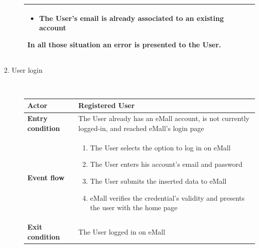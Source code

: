 \documentclass[11pt]{article}
\begin{document}
\begin{description}
\begin{table}[H]
\begin{tabularx}{\textwidth}{|>{\hsize=0.5\hsize}X|>{\hsize=1.5\hsize}X|}
\begin{minipage}[t]{\hsize}
\begin{itemize}[topsep=0pt, leftmargin=*]
                    \item The User's email is already associated to an existing account
                \end{itemize}
                \vspace{8pt}
                \end{minipage}
                In all those situation an error is presented to the User.
                \vspace{6pt}
            \\
            \hline
        \end{tabularx}
    \end{table}
    
    \item [2. User login] \hfill \\
    \begin{table}[H]
        \centering
        \setlength{\tabcolsep}{18pt}
        \renewcommand{\arraystretch}{1.4}
        \begin{tabularx}{\textwidth}{|>{\hsize=0.5\hsize}X|>{\hsize=1.5\hsize}X|}
            \hline
            \textbf{Actor} & Registered User \\
            \hline
            \textbf{Entry condition} & The User already has an eMall account, is not currently logged-in, and reached eMall's login page \\
            \hline
            \textbf{Event flow} & 
                \begin{minipage}[t]{\hsize}
                \begin{enumerate}[topsep=0pt, leftmargin=*]
                    \item The User selects the option to log in on eMall
                    \item The User enters his account's email and password
                    \item The User submits the inserted data to eMall
                    \item eMall verifies the credential's validity and presents the user with the home page
                \end{enumerate}
                \end{minipage}
                \vspace{6pt}
            \\
            \hline
            \textbf{Exit condition} & The User logged in on eMall \\

\end{tabularx}
\end{table}
\end{description}
\end{document}
